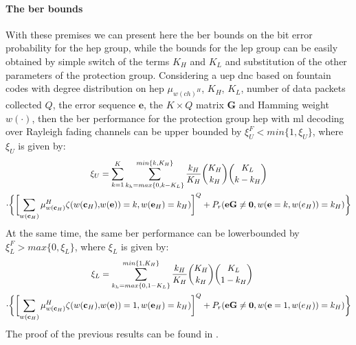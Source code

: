 \paragraph{The \gls{ber} bounds}
With these premises we can present here the \gls{ber} bounds on the bit error probability for the \gls{hep} group, while the bounds for the \gls{lep} group can be easily obtained by simple switch of the terms $K_H$ and $K_L$ and substitution of the other parameters of the protection group. Considering a \gls{uep} \gls{dnc} based on fountain codes with degree distribution on \gls{hep} $\mu_{w(ch)^H}$, $K_H$, $K_L$, number of data packets collected $Q$, the error sequence $\mathbf{e}$, the $K\times Q$ matrix $\mathbf{G}$ and Hamming weight $w(\cdot)$, then the \gls{ber} performance for the protection group \gls{hep} with \gls{ml} decoding over Rayleigh fading channels can be upper bounded by $\xi_U^F < min\{1,\xi_U\}$, where $\xi_U$ is given by:
\begin{align}
\centering
  \xi_U & = \sum_{k=1}^K\sum_{k_h = max\{0,k-K_L\}}^{min\{k,K_H\}}\frac{k_H}{K_H}\binom{K_H}{k_H}\binom{K_L}{k - k_H}\\
   \cdot\biggl\{\biggl[\sum_{w(\mathbf{c}_H)}\mu_{w(\mathbf{c}_H)}^H\zeta(w(\mathbf{c}_H),&w(\mathbf{e})) = k,w(\mathbf{e}_H) = k_H)\biggr]^Q+P_r(\mathbf{eG} \neq \mathbf{0},w(\mathbf{e} = k, w(e_H)) = k_H)\biggr\}
\end{align}
At the same time, the same \gls{ber} performance can be lowerbounded by $\xi_L^F > max\{0,\xi_L\}$, where $\xi_L$ is given by:
\begin{align}
\centering
  \xi_L & = \sum_{k_h = max\{0,1-K_L\}}^{min\{1,K_H\}}\frac{k_H}{K_H}\binom{K_H}{k_H}\binom{K_L}{1 - k_H}\\
   \cdot\biggl\{\biggl[\sum_{w(\mathbf{c}_H)}\mu_{w(\mathbf{c}_H)}^H\zeta(w(\mathbf{c}_H),&w(\mathbf{e})) = 1,w(\mathbf{e}_H) = k_H)\biggr]^Q+P_r(\mathbf{eG} \neq \mathbf{0},w(\mathbf{e} = 1, w(e_H)) = k_H)\biggr\}
\end{align}
The proof of the previous results can be found in \cite{Yue2014}.
